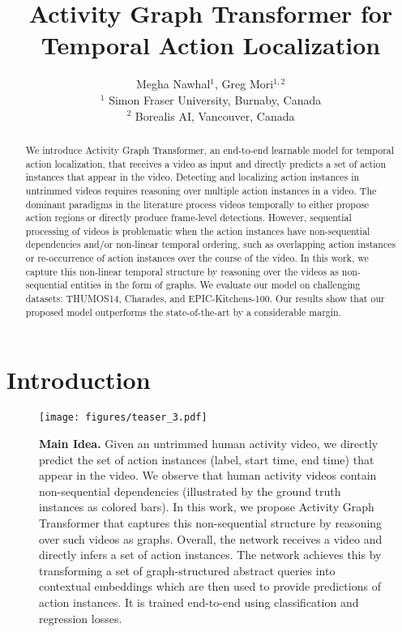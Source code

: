\documentclass[10pt,twocolumn,letterpaper]{article}
\begin{document}
\title{Activity Graph Transformer for Temporal Action Localization}

\author{Megha Nawhal$^{1}$, Greg Mori$^{1,2}$\\
$^{1}$ Simon Fraser University, Burnaby, Canada\\
$^{2}$ Borealis AI, Vancouver, Canada\\
}

\maketitle
\thispagestyle{empty}



\begin{abstract}
We introduce Activity Graph Transformer, an end-to-end learnable model for temporal action localization, that receives a video as input and directly predicts a set of action instances that appear in the video.
Detecting and localizing action instances in untrimmed videos requires reasoning over multiple action instances in a video. The dominant paradigms in the literature process videos temporally to either propose action regions or directly produce frame-level detections. However, sequential processing of videos is problematic when the action instances have non-sequential dependencies and/or non-linear temporal ordering, such as overlapping action instances or re-occurrence of action instances over the course of the video. In this work, we capture this non-linear temporal structure by reasoning over the videos as non-sequential entities in the form of graphs.  We evaluate our model on challenging datasets: THUMOS14, Charades, and EPIC-Kitchens-100. Our results show that our proposed model outperforms the state-of-the-art by a considerable margin.

\end{abstract}


\section{Introduction}






\begin{figure}[t]
    \centering
    \texttt{[image: figures/teaser\_3.pdf]}
    \caption{\textbf{Main Idea.} Given an untrimmed human activity video, we directly predict the set of action instances (label, start time, end time) that appear in the video. We observe that human activity videos contain non-sequential dependencies (illustrated by the ground truth instances as colored bars). In this work, we propose Activity Graph Transformer that captures this non-sequential structure by reasoning over such videos as graphs. Overall, the network receives a video and directly infers a set of action instances. The network achieves this by transforming a set of graph-structured abstract queries into contextual embeddings which are then used to provide predictions of action instances. It is trained end-to-end using classification and regression losses. }
    \label{fig:teaser}
\end{figure}
\end{document}
